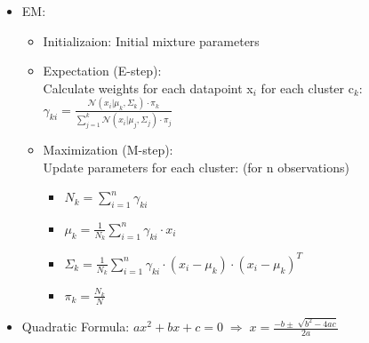 \documentclass[twocolumn, 10pt]{article}
\begin{document}
\begin{itemize}[leftmargin=*, itemsep=0pt]
    \newpage
    \item EM:
    \begin{itemize}[topsep=0pt, itemsep=0pt]
        \item Initializaion: Initial mixture parameters
        \item Expectation (E-step): \\[2pt]
        Calculate weights for each datapoint x$_i$ for each cluster c$_k$: \\[2pt]
        $\displaystyle \gamma_{ki}=\frac{\mathcal{N}(x_i|\mu_k,\Sigma_k)\cdot\pi_k}{\sum_{j = 1}^{k}\mathcal{N}(x_{i}|\mu_{j},\Sigma_{j})\cdot\pi_{j}}$
        \item Maximization (M-step): \\[2pt]
        Update parameters for each cluster: (for n observations)
        \begin{itemize}[topsep=0pt, itemsep=0pt]
            \item $\displaystyle N_{k}={\sum_{i=1}^{n}\gamma_{ki}}$
            \item $\displaystyle \mu_{k}={\frac{1}{N_{k}}\sum_{i=1}^{n}\gamma_{ki}\cdot x_{i}}$
            \item $\displaystyle \Sigma_{k} = \frac{1}{N_{k}}\sum_{i=1}^{n}\gamma_{ki} \cdot (x_{i} - \mu_{k}) \cdot (x_{i} - \mu_{k})^T$
            \item $\displaystyle \pi_{k}={\frac{N_{k}}{N}}$
        \end{itemize}
    \end{itemize}

    \item Quadratic Formula:
    $\displaystyle ax^2+bx+c=0 \;\Rightarrow\; x=\frac{-b\pm\sqrt[]{b^2-4ac}}{2a}$


\end{itemize}
\end{document}
